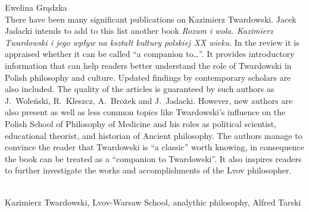 \begin{newrevengenv}{Ewelina Grądzka}
\vspace{15mm}%
{}\\
{
There have been many significant publications on Kazimierz Twardowski. Jacek Jadacki intends to add to this list another book \textit{Rozum i wola. Kazimierz Twardowski i jego wpływ na kształt kultury polskiej XX wieku}. In the review it is appraised whether it can be called ``a companion to…''. It provides introductory information that can help readers better understand the role of Twardowski in Polish philosophy and culture. Updated findings by contemporary scholars are also included. The quality of the articles is guaranteed by such authors as J.~Woleński, R.~Kleszcz, A.~Brożek and J.~Jadacki. However, new authors are also present as well as less common topics like Twardowski's influence on the Polish School of Philosophy of Medicine and his roles as political scientist, educational theorist, and historian of Ancient philosophy. The authors manage to convince the reader that Twardowski is ``a classic'' worth knowing, in consequence the book can be treated as a ``companion to Twardowski''. It also inspires readers to further investigate the works and accomplishments of the Lvov philosopher.    
}\par%
\vspace{2mm}%
{}\\
{Kazimierz Twardowski, Lvov-Warsaw School, analythic philosophy, Alfred Tarski}%



\end{newrevengenv}
